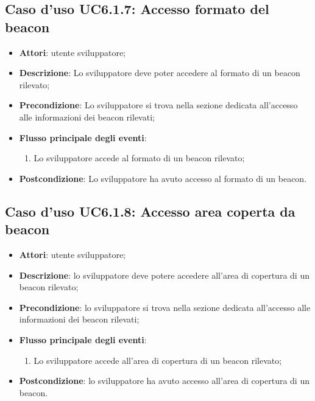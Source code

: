 \documentclass[../AnalisiDeiRequisiti.tex]{subfiles}
\begin{document}
\subsection{Caso d'uso UC6.1.7: Accesso formato del beacon}
\begin{itemize}
\item \textbf{Attori}: utente sviluppatore;
\item \textbf{Descrizione}: Lo sviluppatore deve poter accedere al formato di un beacon rilevato; 
      \item \textbf{Precondizione}: Lo sviluppatore si trova nella sezione dedicata all'accesso alle informazioni dei beacon rilevati;

        \item \textbf{Flusso principale degli eventi}:
          \begin{enumerate}
          \item Lo sviluppatore accede al formato di un beacon rilevato;

      \end{enumerate}
    \item \textbf{Postcondizione}: Lo sviluppatore ha avuto accesso al formato di un beacon.
  \end{itemize}
\hypertarget{UC6.1.8}{}
\subsection{Caso d'uso UC6.1.8: Accesso area coperta da beacon}
\begin{itemize}
\item \textbf{Attori}: utente sviluppatore;
\item \textbf{Descrizione}: lo sviluppatore deve potere accedere all'area di copertura di un beacon rilevato; 
      \item \textbf{Precondizione}: lo sviluppatore si trova nella sezione dedicata all'accesso alle informazioni dei beacon rilevati;

        \item \textbf{Flusso principale degli eventi}:
          \begin{enumerate}
          \item Lo sviluppatore accede all’area di copertura di un beacon rilevato;

      \end{enumerate}
    \item \textbf{Postcondizione}: lo sviluppatore ha avuto accesso all’area di copertura di un beacon.
  \end{itemize}
\hypertarget{UC6.2}{}
\end{document}
